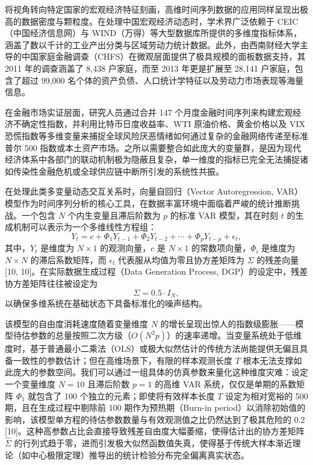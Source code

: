 \documentclass[UTF8,a4paper,12pt]{ctexbook}
\begin{document}
将视角转向特定国家的宏观经济特征刻画，高维时间序列数据的应用同样呈现出极高的数据密度与颗粒度。在处理中国宏观经济动态时，学术界广泛依赖于 CEIC（中国经济信息网）与 WIND（万得）等大型数据库所提供的多维度指标体系，涵盖了数以千计的工业产出分类与区域劳动力统计数据。此外，由西南财经大学主导的中国家庭金融调查（CHFS）在微观层面提供了极具规模的面板数据支持，其 2011 年的调查涵盖了 8,438 户家庭，而至 2013 年更是扩展至 28,141 户家庭，包含了超过 99,000 名个体的资产负债、人口统计学特征以及劳动力市场表现等海量信息。

在金融市场实证层面，研究人员通过合并 147 个月度金融时间序列来构建宏观经济不确定性指数，并利用比特币日度收益率、WTI 原油价格、黄金价格以及 VIX 恐慌指数等多维变量来捕捉全球风险厌恶情绪如何通过复杂的金融网络传递至标准普尔 500 指数或本土资产市场。之所以需要整合如此庞大的变量群，是因为现代经济体系中各部门的联动机制极为隐蔽且复杂，单一维度的指标已完全无法捕捉诸如传染性金融危机或全球供应链中断所引发的系统性共振。

在处理此类多变量动态交互关系时，向量自回归（Vector Autoregression, VAR）模型作为时间序列分析的核心工具，在数据丰富环境中面临着严峻的统计推断挑战。一个包含 $N$ 个内生变量且滞后阶数为 $p$ 的标准 VAR 模型，其在时刻 $t$ 的生成机制可以表示为一个多维线性方程组：
\begin{equation}
Y_{t}=c+\Phi_{1}Y_{t-1}+\Phi_{2}Y_{t-2}+\cdots+\Phi_{p}Y_{t-p}+\epsilon_{t},
\end{equation}
其中，$Y_t$ 是维度为 $N \times 1$ 的观测向量，$c$ 是 $N \times 1$ 的常数项向量，$\Phi_i$ 是维度为 $N \times N$ 的滞后系数矩阵，而 $\epsilon_t$ 代表服从均值为零且协方差矩阵为 $\Sigma$ 的残差向量 [10, 10]。在实际数据生成过程（Data Generation Process, DGP）的设定中，残差协方差矩阵往往被设定为
\begin{equation}
\Sigma = 0.5 \cdot I_N,
\end{equation}
以确保多维系统在基础状态下具备标准化的噪声结构。

该模型的自由度消耗速度随着变量维度 $N$ 的增长呈现出惊人的指数级膨胀——模型待估参数的总量按照二次方级（$O(N^2p)$）的速率递增。当变量系统处于低维度时，基于普通最小二乘法（OLS）或极大似然估计的传统方法尚能提供无偏且具备一致性的参数估计；但在高维场景下，有限的样本观测长度 $T$ 根本无法支撑如此庞大的参数空间。我们可以通过一组具体的仿真参数来量化这种维度灾难：设定一个变量维度 $N=10$ 且滞后阶数 $p=1$ 的高维 VAR 系统，仅仅是单期的系数矩阵 $\Phi_1$ 就包含了 100 个独立的元素；即使将有效样本长度 $T$ 设定为相对宽裕的 500 期，且在生成过程中剔除前 100 期作为预热期（Burn-in period）以消除初始值的影响，该模型单方程的待估参数数量与有效观测值之比仍然达到了极其危险的 0.2 [10]。这种高参数占比会直接导致残差自由度大幅萎缩，使得估计出的协方差矩阵 $\hat{\Sigma}$ 的行列式趋于零，进而引发极大似然函数值失真，使得基于传统大样本渐近理论（如中心极限定理）推导出的统计检验分布完全偏离真实状态。
\end{document}
